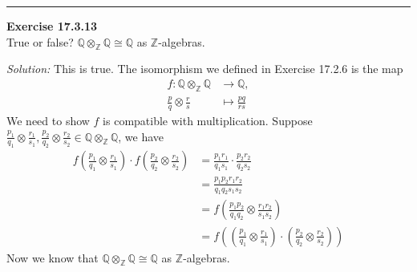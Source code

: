 \documentclass[a4paper, 12pt]{article}
\newenvironment{problem}[2][Exercise]
    { \begin{mdframed}[backgroundcolor=gray!20] \textbf{#1 #2} \\}
    {  \end{mdframed}}
\newenvironment{solution}
    {\textit{Solution:}}
    {}
\begin{document}
\noindent\rule{7in}{2.8pt}
\begin{problem}{17.3.13}
True or false? \(\mathbb{Q}\otimes_\mathbb{Z}\mathbb{Q}\cong \mathbb{Q}\) as \(\mathbb{Z}\)-algebras.
\end{problem}
\begin{solution}
This is true. The isomorphism we defined in Exercise 17.2.6 is the map 
\begin{align*}
	f:\mathbb{Q}\otimes_\mathbb{Z}\mathbb{Q}&\rightarrow \mathbb{Q},\\ 
	  \frac{p}{q}\otimes \frac{r}{s}&\mapsto \frac{pq}{rs}
\end{align*}
We need to show \(f\) is compatible with multiplication. Suppose \(\frac{p_1}{q_1}\otimes \frac{r_1}{s_1},\frac{p_2}{q_2}\otimes \frac{r_2}{s_2}\in \mathbb{Q}\otimes_\mathbb{Z}\mathbb{Q}\), we have 
\begin{align*}
f(\frac{p_1}{q_1}\otimes \frac{r_1}{s_1})\cdot f(\frac{p_2}{q_2}\otimes \frac{r_2}{s_2})&=\frac{p_1r_1}{q_1s_1}\cdot \frac{p_2r_2}{q_2s_2}\\ 
                                                                                        &=\frac{p_1p_2r_1r_2}{q_1q_2s_1s_2}\\ 
																						&=f(\frac{p_1p_2}{q_1q_2}\otimes \frac{r_1r_2}{s_1s_2})\\ 
																						&=f((\frac{p_1}{q_1}\otimes \frac{r_1}{s_1})\cdot (\frac{p_2}{q_2}\otimes \frac{r_2}{s_2}))
\end{align*}
Now we know that \(\mathbb{Q}\otimes_\mathbb{Z}\mathbb{Q}\cong \mathbb{Q}\) as \(\mathbb{Z}\)-algebras.
\end{solution}
\end{document}
